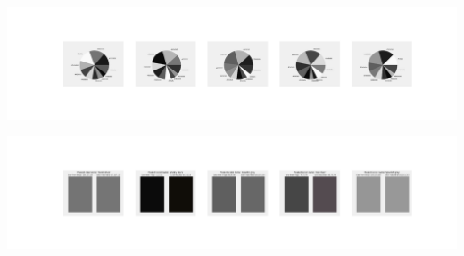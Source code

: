 \documentclass[11pt]{article}
\begin{document}
\begin{landscape}
    \begin{center}
    \includegraphics[width=250mm]{./nbimg/pie-450.jpg}
    \end{center}

    \begin{center}
    \includegraphics[width=250mm]{./nbimg/peak-450.jpg}
    \end{center}
    

\end{landscape}

    
    
    
    
\end{document}
